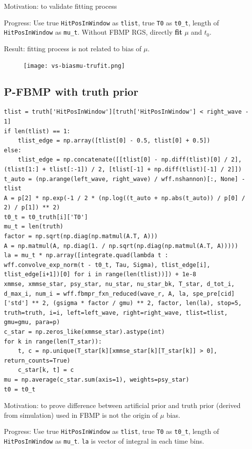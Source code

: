 \documentclass[notitlepage]{article}
\begin{document}
Motivation: to validate fitting process

Progress: Use true \texttt{HitPosInWindow} as \texttt{tlist}, true \texttt{T0} as \texttt{t0\_t}, length of \texttt{HitPosInWindow} as \texttt{mu\_t}. Without FBMP RGS, directly \textbf{fit} $\mu$ and $t_0$. 

Result: fitting process is not related to bias of $\mu$. 

\begin{figure}[H]
    \texttt{[image: vs-biasmu-trufit.png]}
\end{figure}

\subsection{P-FBMP with truth prior}

\begin{lstlisting}
tlist = truth['HitPosInWindow'][truth['HitPosInWindow'] < right_wave - 1]
if len(tlist) == 1:
    tlist_edge = np.array([tlist[0] - 0.5, tlist[0] + 0.5])
else:
    tlist_edge = np.concatenate([[tlist[0] - np.diff(tlist)[0] / 2], (tlist[1:] + tlist[:-1]) / 2, [tlist[-1] + np.diff(tlist)[-1] / 2]])
t_auto = (np.arange(left_wave, right_wave) / wff.nshannon)[:, None] - tlist
A = p[2] * np.exp(-1 / 2 * (np.log((t_auto + np.abs(t_auto)) / p[0] / 2) / p[1]) ** 2)
t0_t = t0_truth[i]['T0']
mu_t = len(truth)
factor = np.sqrt(np.diag(np.matmul(A.T, A)))
A = np.matmul(A, np.diag(1. / np.sqrt(np.diag(np.matmul(A.T, A)))))
la = mu_t * np.array([integrate.quad(lambda t : wff.convolve_exp_norm(t - t0_t, Tau, Sigma), tlist_edge[i], tlist_edge[i+1])[0] for i in range(len(tlist))]) + 1e-8
xmmse, xmmse_star, psy_star, nu_star, nu_star_bk, T_star, d_tot_i, d_max_i, num_i = wff.fbmpr_fxn_reduced(wave_r, A, la, spe_pre[cid]['std'] ** 2, (gsigma * factor / gmu) ** 2, factor, len(la), stop=5, truth=truth, i=i, left=left_wave, right=right_wave, tlist=tlist, gmu=gmu, para=p)
c_star = np.zeros_like(xmmse_star).astype(int)
for k in range(len(T_star)):
    t, c = np.unique(T_star[k][xmmse_star[k][T_star[k]] > 0], return_counts=True)
    c_star[k, t] = c
mu = np.average(c_star.sum(axis=1), weights=psy_star)
t0 = t0_t
\end{lstlisting}

Motivation: to prove difference between artificial prior and truth prior (derived from simulation) used in FBMP is not the origin of $\mu$ bias. 

Progress: Use true \texttt{HitPosInWindow} as \texttt{tlist}, true \texttt{T0} as \texttt{t0\_t}, length of \texttt{HitPosInWindow} as \texttt{mu\_t}. \texttt{la} is vector of integral in each time bins. 
\end{document}
